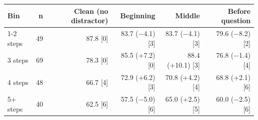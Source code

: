 \begin{tabular}{lrrrrr}
\toprule
Bin & n & Clean (no distractor) & Beginning & Middle & Before question \\
\midrule
1-2 steps & 49 & 87.8 [0] & 83.7 ($-$4.1) [3] & 83.7 ($-$4.1) [3] & 79.6 ($-$8.2) [2] \\
3 steps & 69 & 78.3 [0] & 85.5 (+7.2) [0] & 88.4 (+10.1) [3] & 76.8 ($-$1.4) [4] \\
4 steps & 48 & 66.7 [4] & 72.9 (+6.2) [3] & 70.8 (+4.2) [4] & 68.8 (+2.1) [6] \\
5+ steps & 40 & 62.5 [6] & 57.5 ($-$5.0) [6] & 65.0 (+2.5) [5] & 60.0 ($-$2.5) [6] \\
\bottomrule
\end{tabular}
